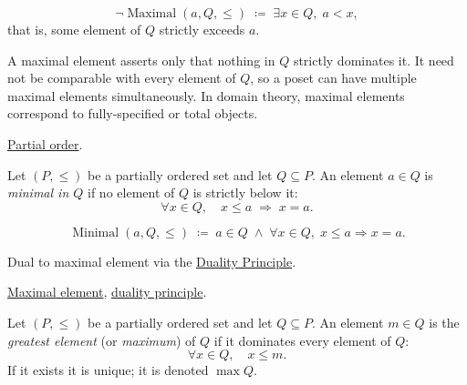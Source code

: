 \begin{remark*}
\[
\neg\operatorname{Maximal}(a, Q, \leq)
\;\coloneqq\;
\exists x \in Q,\; a < x,
\]
that is, some element of $Q$ strictly exceeds $a$.
\end{remark*}

\begin{remark*}[Interpretation]
A maximal element asserts only that nothing in $Q$ strictly dominates it.
It need not be comparable with every element of $Q$, so a poset can have
multiple maximal elements simultaneously.  In domain theory, maximal
elements correspond to fully-specified or total objects.
\end{remark*}

\begin{remark*}[Dependencies]
\hyperref[def:lattice-order-partial-order]{Partial order}.
\end{remark*}


\begin{definition}
\label{def:minimal-element}
Let $(P, \leq)$ be a partially ordered set and let $Q \subseteq P$.  An
element $a \in Q$ is \emph{minimal in $Q$} if no element of $Q$ is
strictly below it:
\[
\forall x \in Q, \quad x \leq a \;\Longrightarrow\; x = a.
\]
\end{definition}

\begin{remark*}
\[
\operatorname{Minimal}(a, Q, \leq)
\;\coloneqq\;
a \in Q \;\land\; \forall x \in Q,\; x \leq a \Rightarrow x = a.
\]
\end{remark*}

\begin{remark*}[Interpretation]
Dual to maximal element via the
\hyperref[prop:duality-principle]{Duality Principle}.
\end{remark*}

\begin{remark*}[Dependencies]
\hyperref[def:maximal-element]{Maximal element},
\hyperref[prop:duality-principle]{duality principle}.
\end{remark*}


\begin{definition}
\label{def:greatest-element}
Let $(P, \leq)$ be a partially ordered set and let $Q \subseteq P$.  An
element $m \in Q$ is the \emph{greatest element} (or \emph{maximum}) of
$Q$ if it dominates every element of $Q$:
\[
\forall x \in Q, \quad x \leq m.
\]
If it exists it is unique; it is denoted $\max Q$.
\end{definition}

